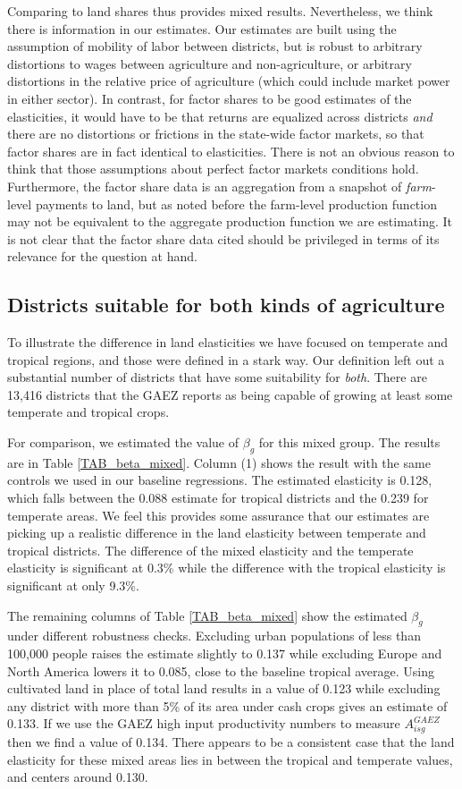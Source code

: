 \documentclass[11pt]{article}
\begin{document}
Comparing to land shares thus provides mixed results. Nevertheless, we think there is information in our estimates. Our estimates are built using the assumption of mobility of labor between districts, but is robust to arbitrary distortions to wages between agriculture and non-agriculture, or arbitrary distortions in the relative price of agriculture (which could include market power in either sector). In contrast, for factor shares to be good estimates of the elasticities, it would have to be that returns are equalized across districts \textit{and} there are no distortions or frictions in the state-wide factor markets, so that factor shares are in fact identical to elasticities. There is not an obvious reason to think that those assumptions about perfect factor markets conditions hold. Furthermore, the factor share data is an aggregation from a snapshot of \textit{farm}-level payments to land, but as noted before the farm-level production function may not be equivalent to the aggregate production function we are estimating. It is not clear that the factor share data cited should be privileged in terms of its relevance for the question at hand.

\subsection{Districts suitable for both kinds of agriculture}
To illustrate the difference in land elasticities we have focused on temperate and tropical regions, and those were defined in a stark way. Our definition left out a substantial number of districts that have some suitability for \textit{both}. There are 13,416 districts that the GAEZ reports as being capable of growing at least some temperate and tropical crops. 

For comparison, we estimated the value of $\beta_g$ for this mixed group. The results are in Table \ref{TAB_beta_mixed}. Column (1) shows the result with the same controls we used in our baseline regressions. The estimated elasticity is 0.128, which falls between the 0.088 estimate for tropical districts and the 0.239 for temperate areas. We feel this provides some assurance that our estimates are picking up a realistic difference in the land elasticity between temperate and tropical districts. The difference of the mixed elasticity and the temperate elasticity is significant at 0.3\% while the difference with the tropical elasticity is significant at only 9.3\%.

The remaining columns of Table \ref{TAB_beta_mixed} show the estimated $\beta_g$ under different robustness checks. Excluding urban populations of less than 100,000 people raises the estimate slightly to 0.137 while excluding Europe and North America lowers it to 0.085, close to the baseline tropical average. Using cultivated land in place of total land results in a value of 0.123 while excluding any district with more than 5\% of its area under cash crops gives an estimate of 0.133. If we use the GAEZ high input productivity numbers to measure $A^{GAEZ}_{isg}$ then we find a value of 0.134. There appears to be a consistent case that the land elasticity for these mixed areas lies in between the tropical and temperate values, and centers around 0.130. 
\end{document}
